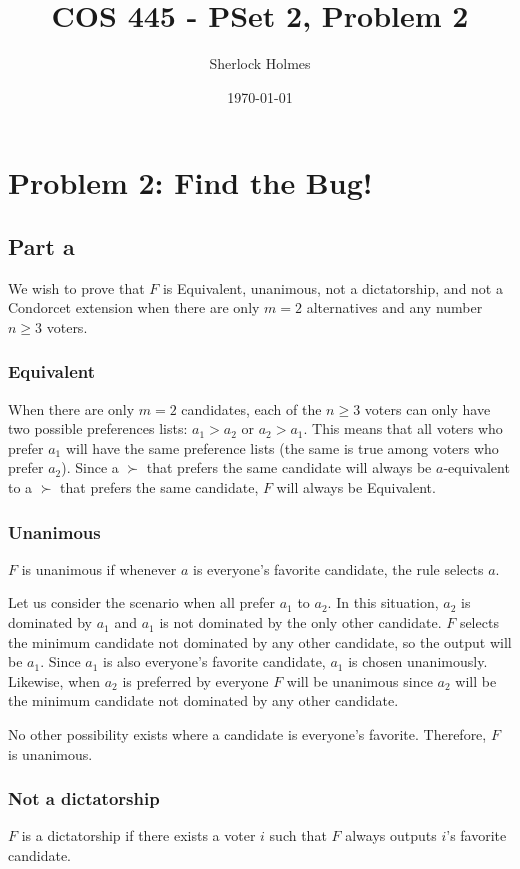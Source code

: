 \documentclass[12pt]{article}%
\begin{document}
\title{COS 445 - PSet 2, Problem 2} %
\author{Sherlock Holmes} %
\date{\today}
\maketitle
\section*{Problem 2: Find the Bug!}
\subsection*{Part a}
We wish to prove that $F$ is Equivalent, unanimous, not a dictatorship, and not a Condorcet extension when there are only $m = 2$ alternatives and any number $n \ge 3$ voters.

\subsubsection*{Equivalent}
When there are only $m = 2$ candidates, each of the $n \ge 3$ voters can only have two possible preferences lists: $a_1 > a_2$ or $a_2 > a_1$. This means that all voters who prefer $a_1$ will have the same preference lists (the same is true among voters who prefer $a_2$). Since a $\succ$ that prefers the same candidate will always be $a$-equivalent to a $\succ$ that prefers the same candidate, $F$ will always be Equivalent.

\subsubsection*{Unanimous}
$F$ is unanimous if whenever $a$ is everyone’s favorite candidate, the rule selects $a$.

Let us consider the scenario when all prefer $a_1$ to $a_2$. In this situation, $a_2$ is dominated by $a_1$ and $a_1$ is not dominated by the only other candidate. $F$ selects the minimum candidate not dominated by any other candidate, so the output will be $a_1$. Since $a_1$ is also everyone's favorite candidate, $a_1$ is chosen unanimously. Likewise, when $a_2$ is preferred by everyone $F$ will be unanimous since $a_2$ will be the minimum candidate not dominated by any other candidate. 

No other possibility exists where a candidate is everyone's favorite. Therefore, $F$ is unanimous.

\subsubsection*{Not a dictatorship}
$F$ is a dictatorship if there exists a voter $i$ such that $F$ always outputs $i$'s favorite candidate.
\end{document}
